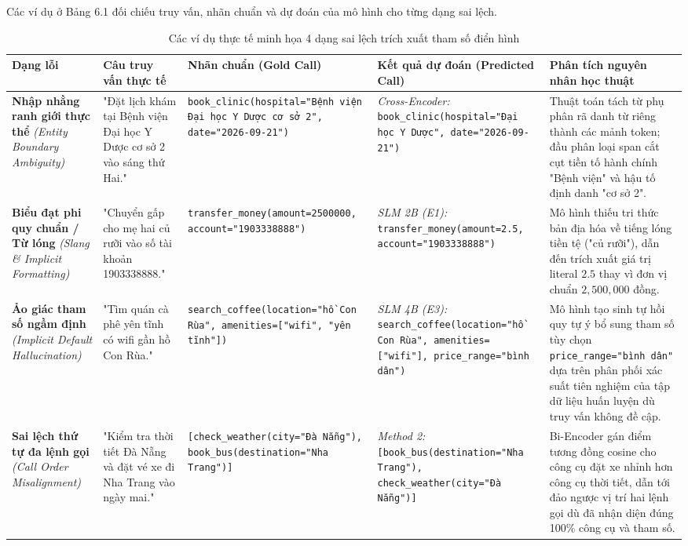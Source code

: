 Các ví dụ ở Bảng 6.1 đối chiếu truy vấn, nhãn chuẩn và dự đoán của mô hình cho từng dạng sai lệch.


\begin{table}[htbp]
    \centering
    \caption{Các ví dụ thực tế minh họa 4 dạng sai lệch trích xuất tham số điển hình}
    \label{tab:bảng_6_1}
    \begin{tabular}{lllll}
        \toprule
        \textbf{Dạng lỗi} & \textbf{Câu truy vấn thực tế} & \textbf{Nhãn chuẩn (Gold Call)} & \textbf{Kết quả dự đoán (Predicted Call)} & \textbf{Phân tích nguyên nhân học thuật} \\
        \midrule
        \textbf{Nhập nhằng ranh giới thực thể} \textit{(Entity Boundary Ambiguity)} & "Đặt lịch khám tại Bệnh viện Đại học Y Dược cơ sở 2 vào sáng thứ Hai." & \texttt{book_clinic(hospital="Bệnh viện Đại học Y Dược cơ sở 2", date="2026-09-21")} & \textit{Cross-Encoder:} \texttt{book_clinic(hospital="Đại học Y Dược", date="2026-09-21")} & Thuật toán tách từ phụ phân rã danh từ riêng thành các mảnh token; đầu phân loại span cắt cụt tiền tố hành chính "Bệnh viện" và hậu tố định danh "cơ sở 2". \\
        \textbf{Biểu đạt phi quy chuẩn / Từ lóng} \textit{(Slang \& Implicit Formatting)} & "Chuyển gấp cho mẹ hai củ rưỡi vào số tài khoản 1903338888." & \texttt{transfer_money(amount=2500000, account="1903338888")} & \textit{SLM 2B (E1):} \texttt{transfer_money(amount=2.5, account="1903338888")} & Mô hình thiếu tri thức bản địa hóa về tiếng lóng tiền tệ ("củ rưỡi"), dẫn đến trích xuất giá trị literal $2.5$ thay vì đơn vị chuẩn $2{,}500{,}000$ đồng. \\
        \textbf{Ảo giác tham số ngầm định} \textit{(Implicit Default Hallucination)} & "Tìm quán cà phê yên tĩnh có wifi gần hồ Con Rùa." & \texttt{search_coffee(location="hồ Con Rùa", amenities=["wifi", "yên tĩnh"])} & \textit{SLM 4B (E3):} \texttt{search_coffee(location="hồ Con Rùa", amenities=["wifi"], price_range="bình dân")} & Mô hình tạo sinh tự hồi quy tự ý bổ sung tham số tùy chọn \texttt{price_range="bình dân"} dựa trên phân phối xác suất tiên nghiệm của tập dữ liệu huấn luyện dù truy vấn không đề cập. \\
        \textbf{Sai lệch thứ tự đa lệnh gọi} \textit{(Call Order Misalignment)} & "Kiểm tra thời tiết Đà Nẵng và đặt vé xe đi Nha Trang vào ngày mai." & \texttt{[check_weather(city="Đà Nẵng"), book_bus(destination="Nha Trang")]} & \textit{Method 2:} \texttt{[book_bus(destination="Nha Trang"), check_weather(city="Đà Nẵng")]} & Bi-Encoder gán điểm tương đồng cosine cho công cụ đặt xe nhỉnh hơn công cụ thời tiết, dẫn tới đảo ngược vị trí hai lệnh gọi dù đã nhận diện đúng 100\% công cụ và tham số. \\
        \bottomrule
    \end{tabular}
\end{table}

